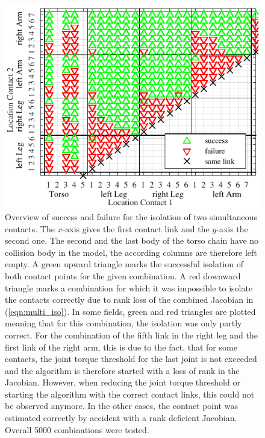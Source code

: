\begin{figure}
\begin{center}
\includegraphics[width=\columnwidth]{figures/collest_multi_stat_2coll_rankmat/rankmat_fig_2coll_Modus2}
\end{center}\vspace*{-0.3cm}
\caption{Overview of success and failure for the isolation of two simultaneous contacts.
The $x$-axis gives the first contact link and the $y$-axis the second one.
The second and the last body of the torso chain have no collision body in the model, the according columns are therefore left empty.
A green upward triangle marks the successful isolation of both contact points for the given combination.
A red downward triangle marks a combination for which it was impossible to isolate the contacts correctly due to rank loss of the combined Jacobian in (\ref{eqn:multi_iso}).
In some fields, green and red triangles are plotted meaning that for this combination, the isolation was only partly correct.
For the combination of the fifth link in the right leg and the first link of the right arm, this is due to the fact, that for some contacts, the joint torque threshold for the last joint is not exceeded and the algorithm is therefore started with a loss of rank in the Jacobian.
However, when reducing the joint torque threshold or starting the algorithm with the correct contact links, this could not be observed anymore.
In the other cases, the contact point was estimated correctly by accident with a rank deficient Jacobian.
Overall 5000 combinations were tested.}\vspace*{-0.5cm}
\label{fig:coll_multicontact_rankJ}
\end{figure}

